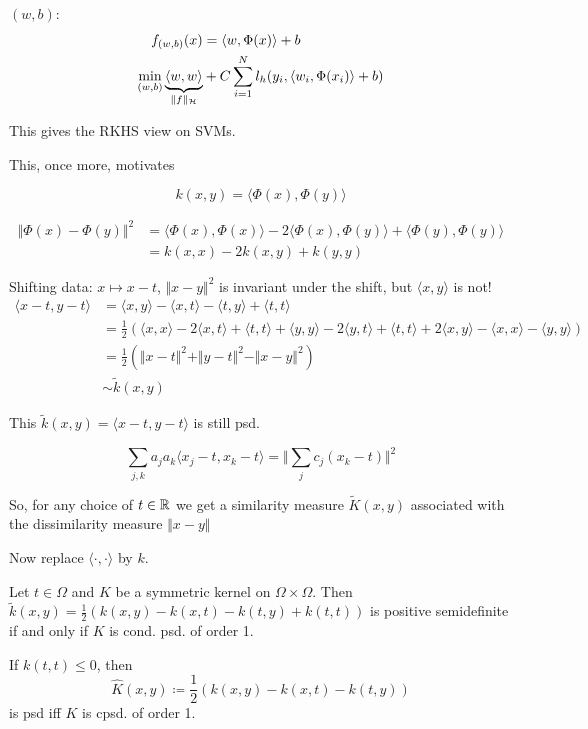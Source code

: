 $(w,b)$:
\begin{align*}
    f_{(w,b)}(x)&=\langle w,\Phi(x)\rangle+b\\
    \min_{(w,b)}\underbrace{\langle w,w\rangle}_{\Vert f\Vert_{\mathcal{H}}} &+ C\sum_{i=1}^N l_h(y_i,\langle w_i,\Phi(x_i)\rangle+b)
\end{align*}


This gives the RKHS view on SVMs.

This, once more, motivates 

\[k(x,y)=\langle \Phi(x),\Phi(y)\rangle\]

\begin{align*}
    \Vert \Phi(x)-\Phi(y)\Vert^2&=\langle\Phi(x),\Phi(x)\rangle-2\langle\Phi(x),\Phi(y)\rangle+\langle\Phi(y),\Phi(y)\rangle\\
    &=k(x,x)-2k(x,y)+k(y,y)
\end{align*}

Shifting data: $x\mapsto x-t$, $\Vert x-y\Vert^2$ is invariant under the shift, but 
$\langle x,y\rangle$ is not!
\begin{align*}
    \langle x-t,y-t\rangle & = \langle x,y\rangle-\langle x,t\rangle-\langle t,y\rangle+\langle t,t\rangle\\
    &=\frac{1}{2}\left(\langle x,x \rangle -2\langle x,t\rangle +\langle t,t\rangle+\langle y,y\rangle-2\langle y,t\rangle+\langle t,t\rangle+2\langle x,y\rangle-\langle x,x\rangle - \langle y,y\rangle\right)\\
    &=\frac{1}{2}\left(\Vert x-t\Vert^2+\Vert y-t\Vert^2-\Vert x-y\Vert^2\right)\\
    &\sim \tilde{k}(x,y)
\end{align*}

This $\tilde{k}(x,y)=\langle x-t,y-t\rangle$ is still psd.


\[\sum_{j,k} a_ja_k\langle x_j-t,x_k-t\rangle = \Vert \sum_{j}c_j(x_k-t)\Vert^2\]

So, for any choice of $t\in\mathbb{R}$ we get a similarity measure $\tilde{K}(x,y)$ associated with the dissimilarity measure $\Vert x-y\Vert$


Now replace $\langle \cdot,\cdot\rangle$ by $k$.

\begin{lemma}\label{lem:54}
    Let $t\in\Omega$ and $K$ be a symmetric kernel on $\Omega\times\Omega$. Then $\tilde{k}(x,y)=\frac{1}{2}(k(x,y)-k(x,t)-k(t,y)+k(t,t))$
    is positive semidefinite if and only if $K$ is cond. psd. of order 1.

    If $k(t,t)\leq 0$, then 
    \[\hat{K}(x,y)\coloneqq \frac{1}{2}(k(x,y)-k(x,t)-k(t,y))\]
    is psd iff $K$ is cpsd. of order 1.
\end{lemma}

